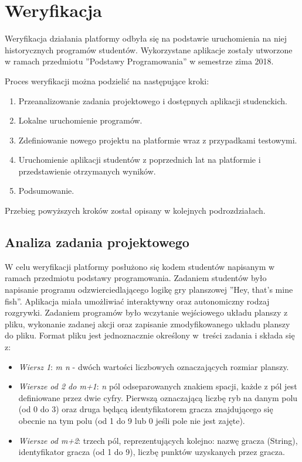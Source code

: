 \chapter{Weryfikacja}
\label{chapter:verify}

Weryfikacja działania platformy odbyła się na podstawie uruchomienia na niej historycznych programów studentów.
Wykorzystane aplikacje zostały utworzone w ramach przedmiotu ”Podstawy Programowania” w semestrze zima 2018.

Proces weryfikacji można podzielić na następujące kroki:
\begin{enumerate}
    \item Przeanalizowanie zadania projektowego i dostępnych aplikacji studenckich.
    \item Lokalne uruchomienie programów.
    \item Zdefiniowanie nowego projektu na platformie wraz z przypadkami testowymi.
    \item Uruchomienie aplikacji studentów z poprzednich lat na platformie i przedstawienie otrzymanych wyników.
    \item Podsumowanie.
\end{enumerate}

Przebieg powyższych kroków został opisany w kolejnych podrozdziałach.


\section{Analiza zadania projektowego}
\label{analysis_students_projects}

W celu weryfikacji platformy posłużono się kodem studentów napisanym w ramach przedmiotu podstawy programowania.
Zadaniem studentów było napisanie programu odzwierciedlającego logikę gry planszowej ”Hey, that’s mine fish”.
Aplikacja miała umożliwiać interaktywny oraz autonomiczny rodzaj rozgrywki.
Zadaniem programów było wczytanie wejściowego układu planszy z pliku, wykonanie zadanej akcji oraz zapisanie zmodyfikowanego układu planszy do pliku.
Format pliku jest jednoznacznie określony w~treści zadania i składa się z:
\begin{itemize}
    \item \textit{Wiersz 1}: \textit{m n} - dwóch wartości liczbowych oznaczających rozmiar planszy.
    \item \textit{Wiersze od 2 do m+1}: \textit{n} pól odseparowanych znakiem spacji, każde z pól jest definiowane przez dwie cyfry.
    Pierwszą oznaczającą liczbę ryb na danym polu (od 0 do 3) oraz druga będącą identyfikatorem gracza znajdującego się obecnie na tym polu (od 1 do 9 lub 0 jeśli pole nie jest zajęte).
    \item \textit{Wiersze od m+2}: trzech pól, reprezentujących kolejno: nazwę gracza (String), identyfikator gracza (od 1 do 9), liczbę punktów uzyskanych przez gracza.
\end{itemize}

